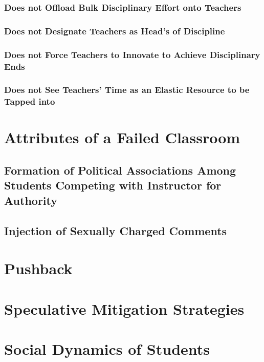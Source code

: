\documentclass[12pt]{article}
\begin{document}
	\subsubsection{Does not Offload Bulk Disciplinary Effort onto Teachers}
	\subsubsection{Does not Designate Teachers as Head's of Discipline}
	\subsubsection{Does not Force Teachers to Innovate to Achieve Disciplinary Ends}
	\subsubsection{Does not See Teachers' Time as an Elastic Resource to be Tapped into}
	
	\section{Attributes of a Failed Classroom}
	\subsection{Formation of Political Associations Among Students Competing with Instructor for Authority}
	\subsection{Injection of Sexually Charged Comments}
	
	\section{Pushback}
	
	\section{Speculative Mitigation Strategies}
	
	\section{Social Dynamics of Students}
\end{document}
